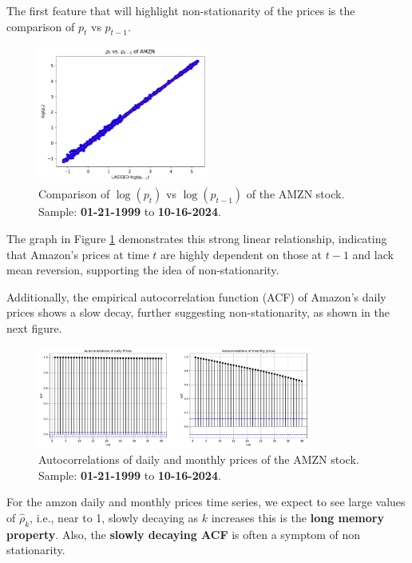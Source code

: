 \documentclass{article}
\begin{document}
The first feature that will highlight non-stationarity of
the prices is the comparison of \( p_t \) vs \( p_{t-1} \).

\begin{figure}[H]
    \centering
    \includegraphics[width=0.5\textwidth]{Img/Laggedlog(p_t-1).pdf}
    \caption{Comparison of \( \log(p_t) \) vs \( \log(p_{t-1}) \) of the AMZN stock.
    Sample: \textbf{01-21-1999} to \textbf{10-16-2024}.}
    \label{fig:LogptVSLogpt-1}
\end{figure}

\noindent The graph in Figure \ref{fig:LogptVSLogpt-1} demonstrates this strong linear 
relationship, indicating that Amazon's prices at time \( t \) are highly dependent on those at \( t-1 \) and lack mean reversion,
 supporting the idea of non-stationarity.

\noindent Additionally, the empirical autocorrelation function (ACF) of Amazon's daily prices shows a slow decay, further suggesting non-stationarity, as shown in the next figure.

\begin{figure}[H]
    \centering
    \includegraphics[width=0.8\textwidth]{Img/Autocorrel_daily_monthly.pdf}
    \caption{Autocorrelations of daily and monthly prices of the AMZN stock.
    Sample: \textbf{01-21-1999} to \textbf{10-16-2024}.}

    \label{fig:Autocorrelations_daily_monthly}
\end{figure}

\noindent For the amzon daily and monthly prices time series, we expect to see large values of $\hat{\rho}_k$, i.e., near to 1, slowly decaying as $k$ increases this is the \textbf{long memory property}.
Also, the \textbf{slowly decaying ACF} is often a symptom of non stationarity.
\end{document}
